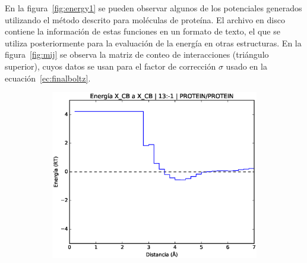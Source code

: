 \par
En la figura~\ref{fig:energy1} se pueden observar algunos de los potenciales generados utilizando el método descrito para moléculas de proteína. 
El archivo en disco contiene la información de estas funciones en un formato de texto, el que se utiliza posteriormente para la evaluación de la energía en otras estructuras.
En la figura~\ref{fig:mij} se observa la matriz de conteo de interacciones (triángulo superior), cuyos datos se usan para el factor de corrección $\sigma$ usado en la ecuación~\ref{ec:finalboltz}.
\clearpage
\begin{figure}[p]
\centering
\begin{subfigure}{.8\textwidth}
\centering
\includegraphics[width=\textwidth]{figures/prot_pot/dd/cb2cb.eps}
\caption{}
\end{subfigure}


\end{figure}
